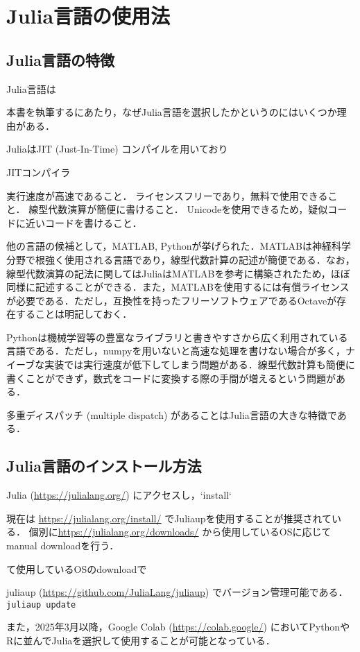 \documentclass[titlepage]{ltjsbook}
\newcommand{\jl}{\lstinline[language=julia]}
\begin{document}
\section{Julia言語の使用法}
\subsection{Julia言語の特徴}
Julia言語は

本書を執筆するにあたり，なぜJulia言語を選択したかというのにはいくつか理由がある．

JuliaはJIT (Just-In-Time) コンパイルを用いており

JITコンパイラ

実行速度が高速であること．
ライセンスフリーであり，無料で使用できること．
線型代数演算が簡便に書けること．
Unicodeを使用できるため，疑似コードに近いコードを書けること．

他の言語の候補として，MATLAB, Pythonが挙げられた．MATLABは神経科学分野で根強く使用される言語であり，線型代数計算の記述が簡便である．なお，線型代数演算の記法に関してはJuliaはMATLABを参考に構築されたため，ほぼ同様に記述することができる．また，MATLABを使用するには有償ライセンスが必要である．ただし，互換性を持ったフリーソフトウェアであるOctaveが存在することは明記しておく．

Pythonは機械学習等の豊富なライブラリと書きやすさから広く利用されている言語である．ただし，numpyを用いないと高速な処理を書けない場合が多く，ナイーブな実装では実行速度が低下してしまう問題がある．線型代数計算も簡便に書くことができず，数式をコードに変換する際の手間が増えるという問題がある．

多重ディスパッチ (multiple dispatch) があることはJulia言語の大きな特徴である．

\subsection{Julia言語のインストール方法}
Julia (\url{https://julialang.org/}) にアクセスし，`install` 

現在は \url{https://julialang.org/install/} でJuliaupを使用することが推奨されている．
個別に\url{https://julialang.org/downloads/} から使用しているOSに応じてmanual downloadを行う．

て使用しているOSのdownloadで

juliaup (\url{https://github.com/JuliaLang/juliaup}) でバージョン管理可能である．\jl{juliaup update}

また，2025年3月以降，Google Colab (\url{https://colab.google/}) においてPythonやRに並んでJuliaを選択して使用することが可能となっている．
\end{document}
